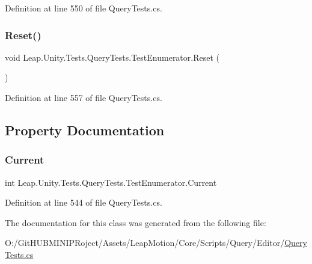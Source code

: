 Definition at line 550 of file Query\+Tests.\+cs.

\mbox{\label{class_leap_1_1_unity_1_1_tests_1_1_query_tests_1_1_test_enumerator_ac9dc19068f6d4f49439216f4cdbe7834}} 
\subsubsection{\texorpdfstring{Reset()}{Reset()}}
{\footnotesize\ttfamily void Leap.\+Unity.\+Tests.\+Query\+Tests.\+Test\+Enumerator.\+Reset (\begin{DoxyParamCaption}{ }\end{DoxyParamCaption})}



Definition at line 557 of file Query\+Tests.\+cs.



\subsection{Property Documentation}
\mbox{\label{class_leap_1_1_unity_1_1_tests_1_1_query_tests_1_1_test_enumerator_a34d69ed8f0700eaa4fed75af9f45f331}} 
\subsubsection{\texorpdfstring{Current}{Current}}
{\footnotesize\ttfamily int Leap.\+Unity.\+Tests.\+Query\+Tests.\+Test\+Enumerator.\+Current\hspace{0.3cm}{\ttfamily [get]}}



Definition at line 544 of file Query\+Tests.\+cs.



The documentation for this class was generated from the following file\+:\begin{DoxyCompactItemize}
\item 
O\+:/\+Git\+H\+U\+B\+M\+I\+N\+I\+P\+Roject/\+Assets/\+Leap\+Motion/\+Core/\+Scripts/\+Query/\+Editor/\mbox{\hyperlink{_query_tests_8cs}{Query\+Tests.\+cs}}\end{DoxyCompactItemize}
